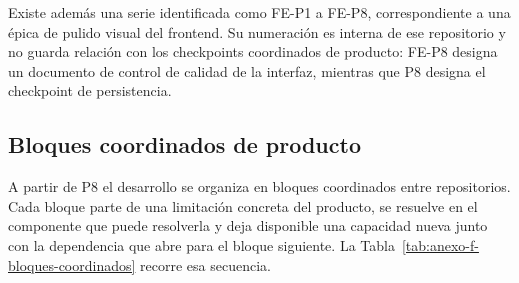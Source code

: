 Existe además una serie identificada como FE-P1 a FE-P8, correspondiente a una épica de pulido visual del frontend. Su numeración es interna de ese repositorio y no guarda relación con los checkpoints coordinados de producto: FE-P8 designa un documento de control de calidad de la interfaz, mientras que P8 designa el checkpoint de persistencia.

\subsection{Bloques coordinados de producto}
\label{anexo:f-bloques-coordinados}

A partir de P8 el desarrollo se organiza en bloques coordinados entre repositorios. Cada bloque parte de una limitación concreta del producto, se resuelve en el componente que puede resolverla y deja disponible una capacidad nueva junto con la dependencia que abre para el bloque siguiente. La Tabla~\ref{tab:anexo-f-bloques-coordinados} recorre esa secuencia.

